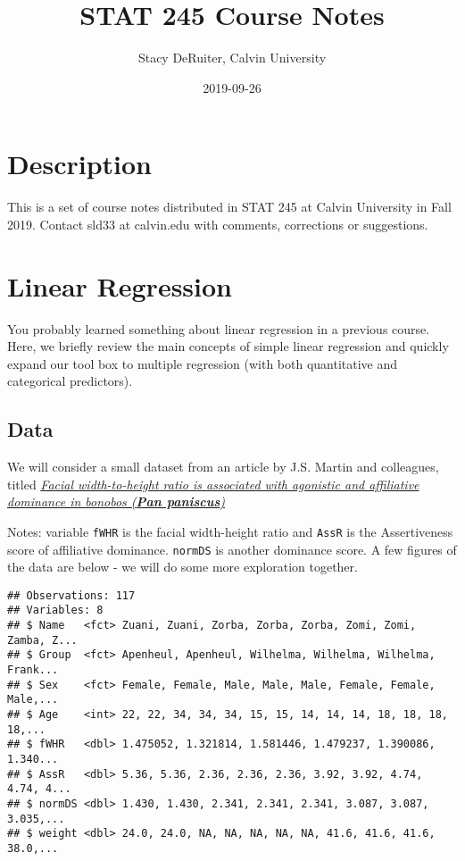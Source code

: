 \documentclass[]{book}
\title{STAT 245 Course Notes}
\author{Stacy DeRuiter, Calvin University}
\date{2019-09-26}
\begin{document}
\maketitle

{
\setcounter{tocdepth}{1}
\tableofcontents
}
\hypertarget{description}{%
\chapter{Description}\label{description}}

This is a set of course notes distributed in STAT 245 at Calvin University in Fall 2019. Contact sld33 at calvin.edu with comments, corrections or suggestions.

\hypertarget{linear-regression}{%
\chapter{Linear Regression}\label{linear-regression}}

You probably learned something about linear regression in a previous course. Here, we briefly review the main concepts of simple linear regression and quickly expand our tool box to multiple regression (with both quantitative and categorical predictors).

\hypertarget{data}{%
\section{Data}\label{data}}

We will consider a small dataset from an article by J.S. Martin and colleagues, titled \href{https://royalsocietypublishing.org/doi/suppl/10.1098/rsbl.2019.0232}{\emph{Facial width-to-height ratio is associated with agonistic and affiliative dominance in bonobos (\textbf{Pan paniscus})}}

Notes: variable \texttt{fWHR} is the facial width-height ratio and \texttt{AssR} is the Assertiveness score of affiliative dominance. \texttt{normDS} is another dominance score. A few figures of the data are below - we will do some more exploration together.

\begin{verbatim}
## Observations: 117
## Variables: 8
## $ Name   <fct> Zuani, Zuani, Zorba, Zorba, Zorba, Zomi, Zomi, Zamba, Z...
## $ Group  <fct> Apenheul, Apenheul, Wilhelma, Wilhelma, Wilhelma, Frank...
## $ Sex    <fct> Female, Female, Male, Male, Male, Female, Female, Male,...
## $ Age    <int> 22, 22, 34, 34, 34, 15, 15, 14, 14, 14, 18, 18, 18, 18,...
## $ fWHR   <dbl> 1.475052, 1.321814, 1.581446, 1.479237, 1.390086, 1.340...
## $ AssR   <dbl> 5.36, 5.36, 2.36, 2.36, 2.36, 3.92, 3.92, 4.74, 4.74, 4...
## $ normDS <dbl> 1.430, 1.430, 2.341, 2.341, 2.341, 3.087, 3.087, 3.035,...
## $ weight <dbl> 24.0, 24.0, NA, NA, NA, NA, NA, 41.6, 41.6, 41.6, 38.0,...
\end{verbatim}
\end{document}
